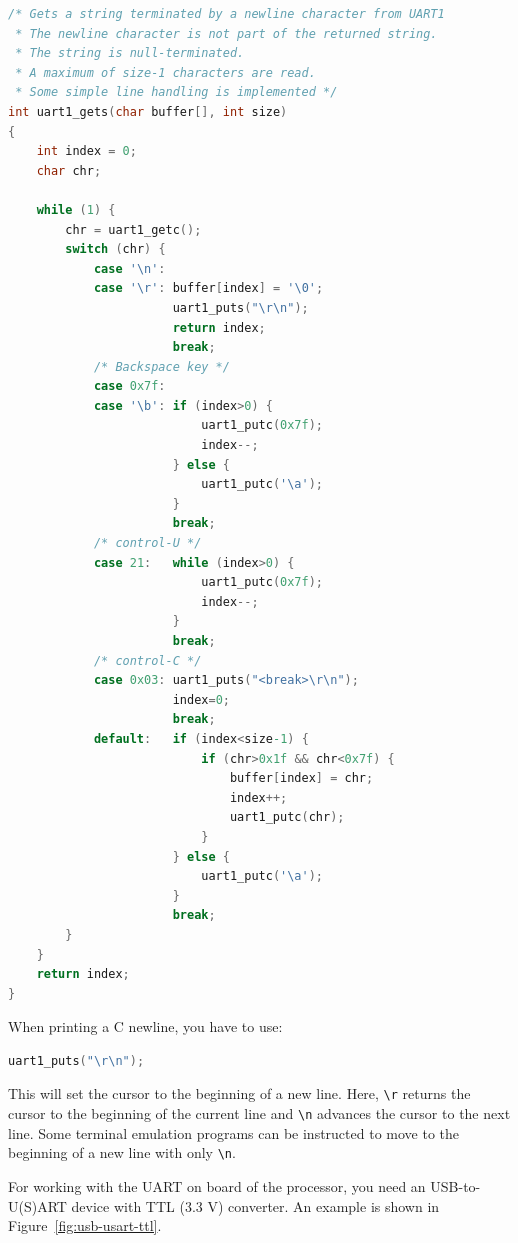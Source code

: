 \documentclass[12pt]{article}
\begin{document}
\begin{lstlisting}[language=C]
/* Gets a string terminated by a newline character from UART1
 * The newline character is not part of the returned string.
 * The string is null-terminated.
 * A maximum of size-1 characters are read.
 * Some simple line handling is implemented */
int uart1_gets(char buffer[], int size)
{
	int index = 0;
	char chr;

	while (1) {
		chr = uart1_getc();
		switch (chr) {
			case '\n':
			case '\r': buffer[index] = '\0';
					   uart1_puts("\r\n");
					   return index;
					   break;
			/* Backspace key */
			case 0x7f:
			case '\b': if (index>0) {
						   uart1_putc(0x7f);
						   index--;
					   } else {
					       uart1_putc('\a');
				       }
					   break;
			/* control-U */
			case 21:   while (index>0) {
					       uart1_putc(0x7f);
						   index--;
					   }
					   break;
			/* control-C */
			case 0x03: uart1_puts("<break>\r\n");
					   index=0;
					   break;
			default:   if (index<size-1) {
					       if (chr>0x1f && chr<0x7f) {
						       buffer[index] = chr;
							   index++;
							   uart1_putc(chr);
						   }
					   } else {
						   uart1_putc('\a');
					   }
					   break;
		}
	}
	return index;
}
\end{lstlisting}

When printing a C newline, you have to use:

\begin{lstlisting}[language=C]
uart1_puts("\r\n");
\end{lstlisting}

This will set the cursor to the beginning of a new line. Here, \lstinline|\r| returns the cursor to the beginning of the current line and \lstinline|\n| advances the cursor to the next line. Some terminal emulation programs can be instructed to move to the beginning of a new line with only \lstinline|\n|.

For working with the UART on board of the processor, you need an USB-to-U(S)ART device with TTL (3.3 V) converter. An example is shown in Figure~\ref{fig:usb-usart-ttl}.
\end{document}

